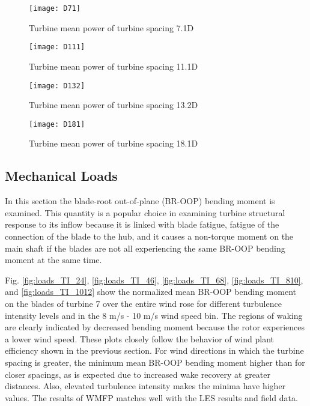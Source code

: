 \documentclass{umthesis}
\begin{document}
\begin{figure}
  \centering
  \texttt{[image: D71]}
  \caption{Turbine mean power of turbine spacing 7.1D}\label{fig:D71}
\end{figure}

\begin{figure}
  \centering
  \texttt{[image: D111]}
  \caption{Turbine mean power of turbine spacing 11.1D}\label{fig:D111}
\end{figure}

\begin{figure}
  \centering
  \texttt{[image: D132]}
  \caption{Turbine mean power of turbine spacing 13.2D}\label{fig:D132}
\end{figure}

\begin{figure}
  \centering
  \texttt{[image: D181]}
  \caption{Turbine mean power of turbine spacing 18.1D}\label{fig:D181}
\end{figure}


\subsection{Mechanical Loads}
In this section the blade-root out-of-plane (BR-OOP) bending moment is examined. This quantity is a popular choice in examining turbine structural response to its inflow because it is linked with blade fatigue, fatigue of the connection of the blade to the hub, and it causes a non-torque moment on the main shaft if the blades are not all experiencing the same BR-OOP bending moment at the same time.

Fig. \ref{fig:loads_TI_24}, \ref{fig:loads_TI_46}, \ref{fig:loads_TI_68}, \ref{fig:loads_TI_810}, and \ref{fig:loads_TI_1012} show the normalized mean BR-OOP bending moment on the blades of turbine 7 over the entire wind rose for different turbulence intensity levels and in the 8 m/s - 10 m/s wind speed bin. The regions of waking are clearly indicated by decreased bending moment because the rotor experiences a lower wind speed. These plots closely follow the behavior of wind plant efficiency shown in the previous section. For wind directions in which the turbine spacing is greater, the minimum mean BR-OOP bending moment higher than for closer spacings, as is expected due to increased wake recovery at greater distances. Also, elevated turbulence intensity makes the minima have higher values. The results of WMFP matches well with the LES results and field data.
\end{document}
